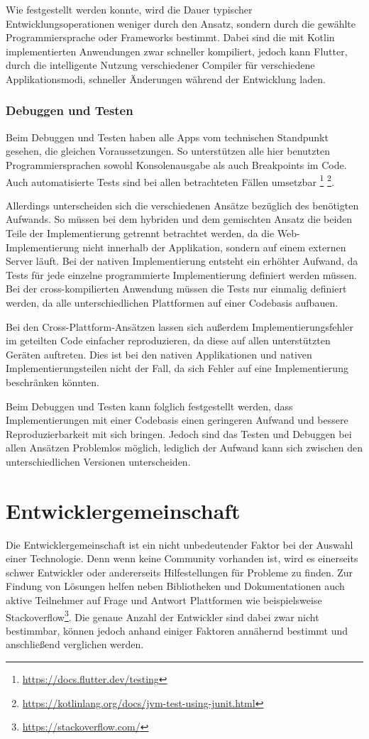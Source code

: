 Wie festgestellt werden konnte, wird die Dauer typischer Entwicklungsoperationen weniger durch den Ansatz, sondern durch die gewählte Programmiersprache oder Frameworks bestimmt. Dabei sind die mit Kotlin implementierten Anwendungen zwar schneller kompiliert, jedoch kann Flutter, durch die intelligente Nutzung verschiedener Compiler für verschiedene Applikationsmodi, schneller Änderungen während der Entwicklung laden.

\subsubsection{Debuggen und Testen}
Beim Debuggen und Testen haben alle Apps vom technischen Standpunkt gesehen, die gleichen Voraussetzungen. So unterstützen alle hier benutzten Programmiersprachen sowohl Konsolenausgabe als auch Breakpoints im Code. Auch automatisierte Tests sind bei allen betrachteten Fällen umsetzbar \footnote{\url{https://docs.flutter.dev/testing}} \footnote{\url{https://kotlinlang.org/docs/jvm-test-using-junit.html}}.

Allerdings unterscheiden sich die verschiedenen Ansätze bezüglich des benötigten Aufwands. So müssen bei dem hybriden und dem gemischten Ansatz die beiden Teile der Implementierung getrennt betrachtet werden, da die Web-Implementierung nicht innerhalb der Applikation, sondern auf einem externen Server läuft. Bei der nativen Implementierung entsteht ein erhöhter Aufwand, da Tests für jede einzelne programmierte Implementierung definiert werden müssen. Bei der cross-kompilierten Anwendung müssen die Tests nur einmalig definiert werden, da alle unterschiedlichen Plattformen auf einer Codebasis aufbauen.

Bei den Cross-Plattform-Ansätzen lassen sich außerdem Implementierungsfehler im geteilten Code einfacher reproduzieren, da diese auf allen unterstützten Geräten auftreten. Dies ist bei den nativen Applikationen und nativen Implementierungsteilen nicht der Fall, da sich Fehler auf eine Implementierung beschränken könnten.

Beim Debuggen und Testen kann folglich festgestellt werden, dass Implementierungen mit einer Codebasis einen geringeren Aufwand und bessere Reproduzierbarkeit mit sich bringen. Jedoch sind das Testen und Debuggen bei allen Ansätzen Problemlos möglich, lediglich der Aufwand kann sich zwischen den unterschiedlichen Versionen unterscheiden.

\section{Entwicklergemeinschaft}
Die Entwicklergemeinschaft ist ein nicht unbedeutender Faktor bei der Auswahl einer Technologie. Denn wenn keine Community vorhanden ist, wird es einerseits schwer Entwickler oder andererseits Hilfestellungen für Probleme zu finden. Zur Findung von Lösungen helfen neben Bibliotheken und Dokumentationen auch aktive Teilnehmer auf Frage und Antwort Plattformen wie beispielsweise Stackoverflow\footnote{\url{https://stackoverflow.com/}}.
Die genaue Anzahl der Entwickler sind dabei zwar nicht bestimmbar, können jedoch anhand einiger Faktoren annähernd bestimmt und anschließend verglichen werden.

